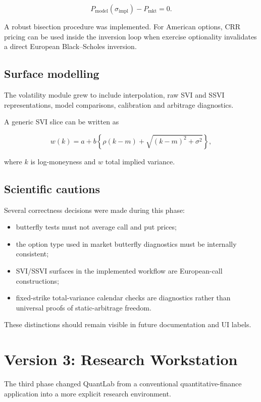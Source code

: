 \documentclass[11pt,a4paper]{article}
\begin{document}
\[
P_{\mathrm{model}}(\sigma_{\mathrm{impl}})-P_{\mathrm{mkt}}=0.
\]

A robust bisection procedure was implemented. For American options, CRR pricing can be used inside the inversion loop when exercise optionality invalidates a direct European Black--Scholes inversion.

\subsection{Surface modelling}

The volatility module grew to include interpolation, raw SVI and SSVI representations, model comparisons, calibration and arbitrage diagnostics.

A generic SVI slice can be written as

\[
w(k)=a+b\left\{\rho(k-m)+\sqrt{(k-m)^2+\sigma^2}\right\},
\]

where \(k\) is log-moneyness and \(w\) total implied variance.

\subsection{Scientific cautions}

Several correctness decisions were made during this phase:

\begin{itemize}[leftmargin=2em]
\item butterfly tests must not average call and put prices;
\item the option type used in market butterfly diagnostics must be internally consistent;
\item SVI/SSVI surfaces in the implemented workflow are European-call constructions;
\item fixed-strike total-variance calendar checks are diagnostics rather than universal proofs of static-arbitrage freedom.
\end{itemize}

These distinctions should remain visible in future documentation and UI labels.

\section{Version 3: Research Workstation}

The third phase changed QuantLab from a conventional quantitative-finance application into a more explicit research environment.
\end{document}
